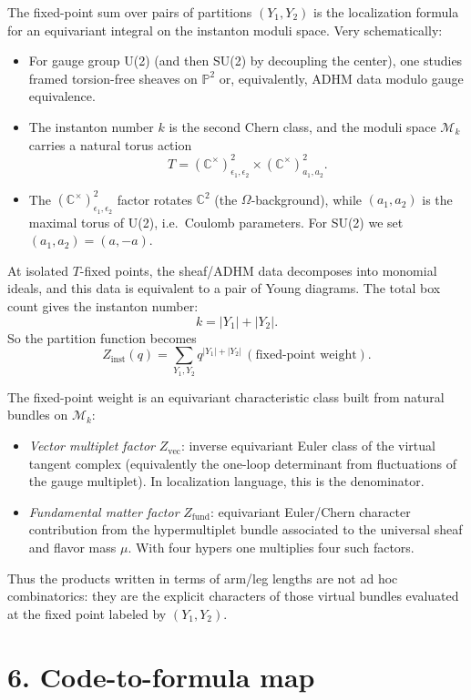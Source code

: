 \documentclass[11pt]{article}
\begin{document}
The fixed-point sum over pairs of partitions $(Y_1,Y_2)$ is the localization formula for an equivariant integral on the instanton moduli space. Very schematically:
\begin{itemize}[leftmargin=2em]
\item For gauge group U(2) (and then SU(2) by decoupling the center), one studies framed torsion-free sheaves on $\mathbb P^2$ or, equivalently, ADHM data modulo gauge equivalence.
\item The instanton number $k$ is the second Chern class, and the moduli space $\mathcal M_k$ carries a natural torus action
\[
T=(\mathbb C^\times)^2_{\epsilon_1,\epsilon_2}\times (\mathbb C^\times)^2_{a_1,a_2}.
\]
\item The $(\mathbb C^\times)^2_{\epsilon_1,\epsilon_2}$ factor rotates $\mathbb C^2$ (the $\Omega$-background), while $(a_1,a_2)$ is the maximal torus of U(2), i.e.\ Coulomb parameters. For SU(2) we set $(a_1,a_2)=(a,-a)$.
\end{itemize}

At isolated $T$-fixed points, the sheaf/ADHM data decomposes into monomial ideals, and this data is equivalent to a pair of Young diagrams. The total box count gives the instanton number:
\[
k=|Y_1|+|Y_2|.
\]
So the partition function becomes
\[
Z_{\mathrm{inst}}(q)=\sum_{Y_1,Y_2}q^{|Y_1|+|Y_2|}\,(\text{fixed-point weight}).
\]

The fixed-point weight is an equivariant characteristic class built from natural bundles on $\mathcal M_k$:
\begin{itemize}[leftmargin=2em]
\item \emph{Vector multiplet factor} $Z_{\mathrm{vec}}$: inverse equivariant Euler class of the virtual tangent complex (equivalently the one-loop determinant from fluctuations of the gauge multiplet). In localization language, this is the denominator.
\item \emph{Fundamental matter factor} $Z_{\mathrm{fund}}$: equivariant Euler/Chern character contribution from the hypermultiplet bundle associated to the universal sheaf and flavor mass $\mu$. With four hypers one multiplies four such factors.
\end{itemize}

Thus the products written in terms of arm/leg lengths are not ad hoc combinatorics: they are the explicit characters of those virtual bundles evaluated at the fixed point labeled by $(Y_1,Y_2)$.

\section*{6. Code-to-formula map}
\end{document}

